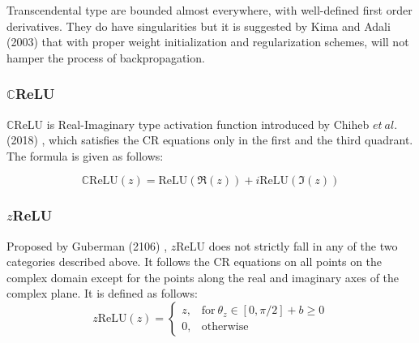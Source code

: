  Transcendental type are bounded almost everywhere, with well-defined first order derivatives. They do have singularities but it is suggested by Kima and Adali (2003) \cite{kim2003approximation} that with proper weight initialization and regularization schemes, will not hamper the process of backpropagation.
 
 
 
 




\subsubsection{$\mathbb{C}$ReLU}
$\mathbb{C}$ReLU is Real-Imaginary type activation function introduced by Chiheb $et \ al.$ (2018) \cite{trabelsi2018deep}, which satisfies the CR equations only in the first and the third quadrant. The formula is given as follows:

\begin{equation}
\label{eqcrelu}
\mathbb{C}\mathrm{ReLU}(z) = \mathrm{ReLU}(\Re(z))+i\mathrm{ReLU}(\Im(z))
\end{equation}

 
 
 \subsubsection{$z$ReLU}
 Proposed by Guberman (2106) \cite{Guberman}, $z$ReLU does not strictly fall in any of the two categories described above. It follows the CR equations on all points on the complex domain except for the points along the real and imaginary axes of the complex plane. It is defined as follows:
  \begin{equation}
  \label{eqzrelu}
 z\mathrm{ReLU}(z) 
 {}=\begin{cases} z , &\mathrm{for} \ \theta_{z} \in [0,\pi/2] + b\ge 0 \\ 0 , &\textrm{otherwise} \end{cases}
 \end{equation}

